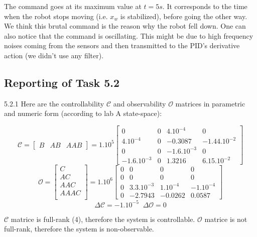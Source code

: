 \documentclass[11pt]{article}
\begin{document}
The command goes at its maximum value at $t=5 s$. It corresponds to the time when the robot stops moving (i.e. $x_w$ is stabilized), before going the other way. We think this brutal command is the reason why the robot fell down.
One can also notice that the command is oscillating. This might be due to high frequency noises coming from the sensors and then transmitted to the PID's derivative action (we didn't use any filter).

\subsection*{Reporting of Task 5.2}

5.2.1 Here are the controllability $\mathcal{C}$ and observability $\mathcal{O}$ matrices in parametric and numeric form (according to lab A state-space):

\begin{equation*}
\mathcal{C}=
	\begin{bmatrix}
	B & AB & AAB
	\end{bmatrix}
	=1.10^5
	\begin{bmatrix}
	0 & 0 & 4.10^{-4} & 0 \\
	4.10^{-4} & 0 & -0.3087 & -1.44.10^{-2} \\
	0 & 0 & -1.6.10^{-3} & 0 \\
	-1.6.10^{-3} & 0 & 1.3216 & 6.15.10^{-2}
	\end{bmatrix}
\end{equation*}
\begin{equation*}
\mathcal{O}=
	\begin{bmatrix}
	C \\
	AC \\
	AAC \\
	AAAC \\
	\end{bmatrix}
	=1.10^6
	\begin{bmatrix}
	0 & 0 & 0 & 0 \\
	0 & 0 & 0 & 0 \\
	0 & 3.3.10^{-3} & 1.10^{-4} & -1.10^{-4} \\
	0 & -2.7943 & -0.0262 & 0.0587
	\end{bmatrix}
\end{equation*}
\begin{equation*}
\Delta\mathcal{C}=-1.10^{-5} \;\; \Delta\mathcal{O}=0
\end{equation*}

$\mathcal{C}$ matrice is full-rank (4), therefore the system is controllable. 
$\mathcal{O}$ matrice is not full-rank, therefore the system is non-observable.
\end{document}
